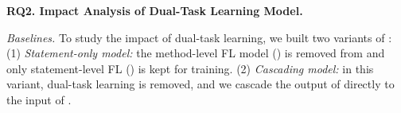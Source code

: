 

%
%





\vspace{3pt}
{\bf RQ2. Impact Analysis of Dual-Task Learning Model.}

\vspace{1pt}
\emph{Baselines.} To study the impact of dual-task learning, we built two variants of {\tool}: 
(1) {\em Statement-only model:} the method-level FL model
() is removed from {\tool} and only statement-level FL
() is kept for training. (2) {\em Cascading model:} in
this variant, dual-task learning is removed, and we cascade the
output of  directly to the input of .

